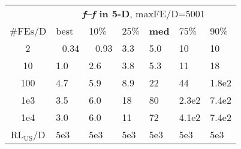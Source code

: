 \begin{tabular}{c|llllll}
 & \multicolumn{6}{|c}{\textbf{\textit{f}\raisebox{-0.35ex}{1}--\textit{f}\raisebox{-0.35ex}{24} in 5-D}, maxFE/D=5001}\\
\#FEs/D & best & 10\% & 25\% & \textbf{med} & 75\% & 90\%\\
2 & ~\,0.34 & ~\,0.93 & \hspace*{1ex}3.3 & \hspace*{1ex}5.0 & 10 & 10\\
10 & \hspace*{1ex}1.0 & \hspace*{1ex}2.6 & \hspace*{1ex}3.8 & \hspace*{1ex}5.3 & 11 & 18\\
100 & \hspace*{1ex}4.7 & \hspace*{1ex}5.9 & \hspace*{1ex}8.9 & 22 & 44 & 1.8e2\\
1e3 & \hspace*{1ex}3.5 & \hspace*{1ex}6.0 & 18 & 80 & 2.3e2 & 7.4e2\\
1e4 & \hspace*{1ex}3.0 & \hspace*{1ex}6.0 & 11 & 72 & 4.1e2 & 7.4e2\\
$\text{RL}_{\text{US}}$/D & 5e3 & 5e3 & 5e3 & 5e3 & 5e3 & 5e3
\end{tabular}

